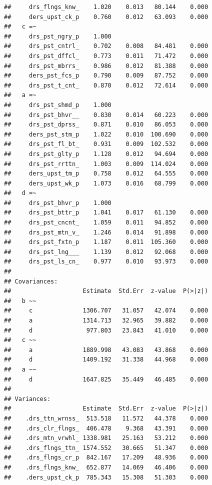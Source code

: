 \documentclass[
]{book}
\begin{document}
\begin{verbatim}
##     drs_flngs_knw_    1.020    0.013   80.144    0.000
##     ders_upst_ck_p    0.760    0.012   63.093    0.000
##   c =~                                                
##     drs_pst_ngry_p    1.000                           
##     drs_pst_cntrl_    0.702    0.008   84.481    0.000
##     drs_pst_dffcl_    0.773    0.011   71.472    0.000
##     drs_pst_mbrrs_    0.986    0.012   81.388    0.000
##     ders_pst_fcs_p    0.790    0.009   87.752    0.000
##     drs_pst_t_cnt_    0.870    0.012   72.614    0.000
##   a =~                                                
##     drs_pst_shmd_p    1.000                           
##     drs_pst_bhvr__    0.830    0.014   60.223    0.000
##     drs_pst_dprss_    0.871    0.010   86.053    0.000
##     ders_pst_stm_p    1.022    0.010  100.690    0.000
##     drs_pst_fl_bt_    0.931    0.009  102.532    0.000
##     drs_pst_glty_p    1.128    0.012   94.694    0.000
##     drs_pst_rrttn_    1.003    0.009  114.024    0.000
##     ders_upst_tm_p    0.758    0.012   64.555    0.000
##     ders_upst_wk_p    1.073    0.016   68.799    0.000
##   d =~                                                
##     drs_pst_bhvr_p    1.000                           
##     drs_pst_bttr_p    1.041    0.017   61.130    0.000
##     drs_pst_cncnt_    1.059    0.011   94.852    0.000
##     drs_pst_mtn_v_    1.246    0.014   91.898    0.000
##     drs_pst_fxtn_p    1.187    0.011  105.360    0.000
##     drs_pst_lng___    1.139    0.012   92.068    0.000
##     drs_pst_ls_cn_    0.977    0.010   93.973    0.000
## 
## Covariances:
##                    Estimate  Std.Err  z-value  P(>|z|)
##   b ~~                                                
##     c              1306.707   31.057   42.074    0.000
##     a              1314.713   32.965   39.882    0.000
##     d               977.803   23.843   41.010    0.000
##   c ~~                                                
##     a              1889.998   43.083   43.868    0.000
##     d              1409.192   31.338   44.968    0.000
##   a ~~                                                
##     d              1647.825   35.449   46.485    0.000
## 
## Variances:
##                    Estimate  Std.Err  z-value  P(>|z|)
##    .drs_ttn_wrnss_  513.518   11.572   44.378    0.000
##    .drs_clr_flngs_  406.478    9.368   43.391    0.000
##    .drs_mtn_vrwhl_ 1338.981   25.163   53.212    0.000
##    .drs_flngs_ttn_ 1574.552   30.665   51.347    0.000
##    .drs_flngs_cr_p  842.167   17.209   48.936    0.000
##    .drs_flngs_knw_  652.877   14.069   46.406    0.000
##    .ders_upst_ck_p  785.343   15.308   51.303    0.000

\end{verbatim}
\end{document}
